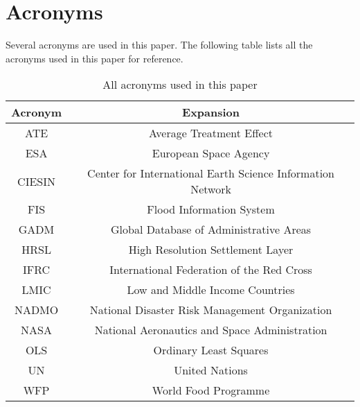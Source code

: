 \chapter{Acronyms}

Several acronyms are used in this paper. The following table lists all the acronyms used in this paper for reference.

\begin{table}
\centering
\begin{tabular}{|c|c|}
\hline
\textbf{Acronym} & \textbf{Expansion} \\
\hline
ATE & Average Treatment Effect \\
ESA & European Space Agency \\
CIESIN & Center for International Earth Science Information Network \\
FIS & Flood Information System \\ 
GADM  & Global Database of Administrative Areas \\
HRSL & High Resolution Settlement Layer \\
IFRC & International Federation of the Red Cross \\
LMIC & Low and Middle Income Countries \\
NADMO & National Disaster Risk Management Organization \\
NASA & National Aeronautics and Space Administration \\
OLS & Ordinary Least Squares \\
UN & United Nations \\
WFP & World Food Programme \\

\hline
\end{tabular}
\caption{All acronyms used in this paper}
\end{table}

